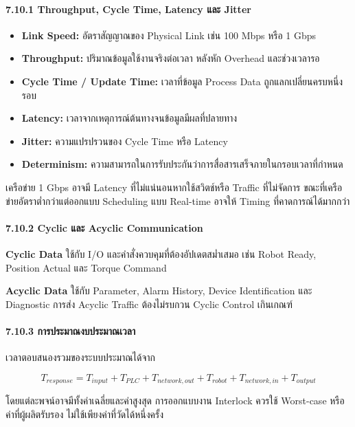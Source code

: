\paragraph{7.10.1 Throughput, Cycle Time, Latency และ Jitter}

\begin{itemize}
    \item \textbf{Link Speed:} อัตราสัญญาณของ Physical Link เช่น 100 Mbps หรือ 1 Gbps
    \item \textbf{Throughput:} ปริมาณข้อมูลใช้งานจริงต่อเวลา หลังหัก Overhead และช่วงเวลารอ
    \item \textbf{Cycle Time / Update Time:} เวลาที่ข้อมูล Process Data ถูกแลกเปลี่ยนครบหนึ่งรอบ
    \item \textbf{Latency:} เวลาจากเหตุการณ์ต้นทางจนข้อมูลมีผลที่ปลายทาง
    \item \textbf{Jitter:} ความแปรปรวนของ Cycle Time หรือ Latency
    \item \textbf{Determinism:} ความสามารถในการรับประกันว่าการสื่อสารเสร็จภายในกรอบเวลาที่กำหนด
\end{itemize}

เครือข่าย 1 Gbps อาจมี Latency ที่ไม่แน่นอนหากใช้สวิตช์หรือ Traffic ที่ไม่จัดการ ขณะที่เครือข่ายอัตราต่ำกว่าแต่ออกแบบ Scheduling แบบ Real-time อาจให้ Timing ที่คาดการณ์ได้มากกว่า

\paragraph{7.10.2 Cyclic และ Acyclic Communication}

\textbf{Cyclic Data} ใช้กับ I/O และคำสั่งควบคุมที่ต้องอัปเดตสม่ำเสมอ เช่น Robot Ready, Position Actual และ Torque Command

\textbf{Acyclic Data} ใช้กับ Parameter, Alarm History, Device Identification และ Diagnostic การส่ง Acyclic Traffic ต้องไม่รบกวน Cyclic Control เกินเกณฑ์

\paragraph{7.10.3 การประมาณงบประมาณเวลา}

เวลาตอบสนองรวมของระบบประมาณได้จาก

\[
T_{response}=T_{input}+T_{PLC}+T_{network,out}+T_{robot}+T_{network,in}+T_{output}
\]

โดยแต่ละพจน์อาจมีทั้งค่าเฉลี่ยและค่าสูงสุด การออกแบบงาน Interlock ควรใช้ Worst-case หรือค่าที่ผู้ผลิตรับรอง ไม่ใช้เพียงค่าที่วัดได้หนึ่งครั้ง

